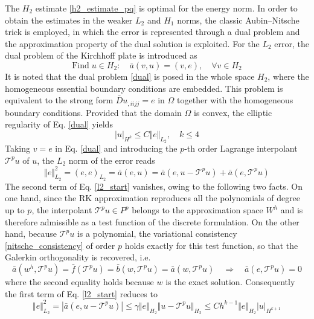 The $H_2$ estimate \eqref{h2_estimate_pq} is optimal for the energy norm.
In order to obtain the estimates in the weaker $L_2$ and $H_1$ norms, the classic Aubin--Nitsche trick \cite{} is employed, in which the error is represented through a dual problem and the approximation property of the dual solution is exploited.
For the $L_2$ error, the dual problem of the Kirchhoff plate is introduced as
\begin{equation}\label{dual}
	\textrm{Find}\; u\in H_2:\quad \bar a(v,u)=(v,e),\quad \forall v\in H_2
\end{equation}
It is noted that the dual problem \eqref{dual} is posed in the whole space $H_2$, where the homogeneous essential boundary conditions are embedded.
This problem is equivalent to the strong form $\bar D u_{,iijj}=e$ in $\Omega$ together with the homogeneous boundary conditions.
Provided that the domain $\Omega$ is convex, the elliptic regularity \cite{} of Eq. \eqref{dual} yields
\begin{equation}\label{regularity}
	\vert u \vert_{H^{k}}\le C\Vert e \Vert_{L_2},\quad k\le 4
\end{equation}
Taking $v=e$ in Eq. \eqref{dual} and introducing the $p$-th order Lagrange interpolant $\mathcal T^{p}u$ of $u$, the $L_2$ norm of the error reads
\begin{equation}\label{l2_start}
	\Vert e \Vert_{L_2}^2=(e,e)_{L_2}=\bar a(e,u)=\bar a(e,u-\mathcal T^{p}u)+\bar a(e,\mathcal T^{p}u)
\end{equation}
The second term of Eq. \eqref{l2_start} vanishes, owing to the following two facts.
On one hand, since the RK approximation reproduces all the polynomials of degree up to $p$, the interpolant $\mathcal T^{p}u\in P^p$ belongs to the approximation space $W^h$ and is therefore admissible as a test function of the discrete formulation.
On the other hand, because $\mathcal T^{p}u$ is a polynomial, the variational consistency \eqref{nitsche_consistency} of order $p$ holds exactly for this test function, so that the Galerkin orthogonality is recovered, i.e.
\begin{equation}\label{poly_orthogonality}
	\bar a(w^{h}, \mathcal T^{p}u)=\bar f(\mathcal T^{p}u)=\bar b(w, \mathcal T^{p}u)=\bar a(w, \mathcal T^{p}u)
	\quad\Rightarrow\quad
	\bar a(e,\mathcal T^{p}u)=0
\end{equation}
where the second equality holds because $w$ is the exact solution.
Consequently the first term of Eq. \eqref{l2_start} reduces to
\begin{equation}\label{l2_estimate}
	\Vert e \Vert_{L_2}^2=\left|\bar a(e,u-\mathcal T^{p}u)\right|\le\gamma\Vert e \Vert_{H_2}\Vert u-\mathcal T^{p}u \Vert_{H_2}\le C h^{k-1}\Vert e \Vert_{H_2}\vert u \vert_{H^{k+1}}
\end{equation}
